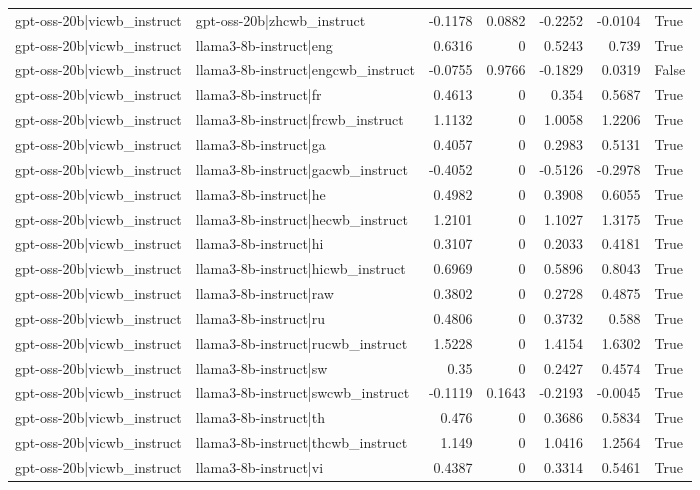 \begin{table}
\begin{tabular}{l l r r r r l}
gpt-oss-20b|vicwb_instruct & gpt-oss-20b|zhcwb_instruct & -0.1178 & 0.0882 & -0.2252 & -0.0104 & True \\
gpt-oss-20b|vicwb_instruct & llama3-8b-instruct|eng & 0.6316 & 0 & 0.5243 & 0.739 & True \\
gpt-oss-20b|vicwb_instruct & llama3-8b-instruct|engcwb_instruct & -0.0755 & 0.9766 & -0.1829 & 0.0319 & False \\
gpt-oss-20b|vicwb_instruct & llama3-8b-instruct|fr & 0.4613 & 0 & 0.354 & 0.5687 & True \\
gpt-oss-20b|vicwb_instruct & llama3-8b-instruct|frcwb_instruct & 1.1132 & 0 & 1.0058 & 1.2206 & True \\
gpt-oss-20b|vicwb_instruct & llama3-8b-instruct|ga & 0.4057 & 0 & 0.2983 & 0.5131 & True \\
gpt-oss-20b|vicwb_instruct & llama3-8b-instruct|gacwb_instruct & -0.4052 & 0 & -0.5126 & -0.2978 & True \\
gpt-oss-20b|vicwb_instruct & llama3-8b-instruct|he & 0.4982 & 0 & 0.3908 & 0.6055 & True \\
gpt-oss-20b|vicwb_instruct & llama3-8b-instruct|hecwb_instruct & 1.2101 & 0 & 1.1027 & 1.3175 & True \\
gpt-oss-20b|vicwb_instruct & llama3-8b-instruct|hi & 0.3107 & 0 & 0.2033 & 0.4181 & True \\
gpt-oss-20b|vicwb_instruct & llama3-8b-instruct|hicwb_instruct & 0.6969 & 0 & 0.5896 & 0.8043 & True \\
gpt-oss-20b|vicwb_instruct & llama3-8b-instruct|raw & 0.3802 & 0 & 0.2728 & 0.4875 & True \\
gpt-oss-20b|vicwb_instruct & llama3-8b-instruct|ru & 0.4806 & 0 & 0.3732 & 0.588 & True \\
gpt-oss-20b|vicwb_instruct & llama3-8b-instruct|rucwb_instruct & 1.5228 & 0 & 1.4154 & 1.6302 & True \\
gpt-oss-20b|vicwb_instruct & llama3-8b-instruct|sw & 0.35 & 0 & 0.2427 & 0.4574 & True \\
gpt-oss-20b|vicwb_instruct & llama3-8b-instruct|swcwb_instruct & -0.1119 & 0.1643 & -0.2193 & -0.0045 & True \\
gpt-oss-20b|vicwb_instruct & llama3-8b-instruct|th & 0.476 & 0 & 0.3686 & 0.5834 & True \\
gpt-oss-20b|vicwb_instruct & llama3-8b-instruct|thcwb_instruct & 1.149 & 0 & 1.0416 & 1.2564 & True \\
gpt-oss-20b|vicwb_instruct & llama3-8b-instruct|vi & 0.4387 & 0 & 0.3314 & 0.5461 & True \\

\end{tabular}
\end{table}
